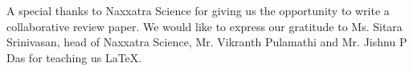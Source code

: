A special thanks to Naxxatra Science for giving us the opportunity to write a collaborative review paper. We would like to express our gratitude to Ms. Sitara Srinivasan, head of Naxxatra Science, Mr. Vikranth Pulamathi and Mr. Jishnu P Das for teaching us \LaTeX.
